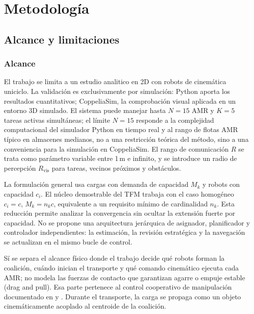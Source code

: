 \section{Metodología}
\label{sec:metodologia}

\subsection{Alcance y limitaciones}
\label{sec:alcance}

\subsubsection{Alcance}

El trabajo se limita a un estudio analitico en 2D con robots de cinemática uniciclo. La validación
es exclusivamente por simulación: Python aporta los resultados cuantitativos; CoppeliaSim,
la comprobación visual aplicada en un entorno 3D simulado. El sistema puede manejar hasta
$N = 15$ AMR y $K = 5$ tareas activas simultáneas; el límite $N = 15$ responde
a la complejidad computacional del simulador Python en tiempo real y al rango de
flotas AMR típico en almacenes medianos, no a una restricción teórica del método, sino a una conveniencia para la simulación en CoppeliaSim.
El rango de comunicación $R$ se trata como parámetro variable entre 1\,m e infinito, y
se introduce un radio de percepción $R_{\mathrm{vis}}$ para tareas, vecinos próximos y
obstáculos.

La formulación general usa cargas con demanda de capacidad $M_k$ y robots con capacidad
$c_i$. El núcleo demostrable del TFM trabaja con el caso homogéneo
$c_i=c$, $M_k=n_kc$, equivalente a un requisito mínimo de cardinalidad $n_k$. Esta
reducción permite analizar la convergencia sin ocultar la extensión fuerte por
capacidad. No se propone una arquitectura jerárquica de asignador, planificador y
controlador independientes: la estimación, la revisión estratégica y la navegación se
actualizan en el mismo bucle de control.

Sí se separa el alcance físico donde el trabajo decide
qué robots forman la coalición, cuándo inician el transporte y qué comando cinemático
ejecuta cada AMR; no modela las fuerzas de contacto que garantizan agarre o empuje
estable (drag and pull). Esa parte pertenece al control cooperativo de manipulación documentado en
\citet{ebel2024cooperative} y \citet{rosenfelder2024force}. Durante el transporte, la
carga se propaga como un objeto cinemáticamente acoplado al centroide de la coalición.

